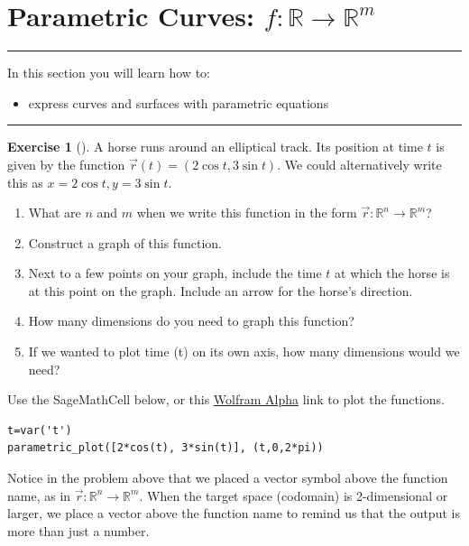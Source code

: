 \documentclass[10pt,]{book}
\theoremstyle{plain}
\theoremstyle{definition}
\theoremstyle{definition}
\theoremstyle{definition}
\theoremstyle{definition}
\newtheorem{exploration}[project]{Exercise}
\newenvironment{objectives}[1]{\noindent\rule{\linewidth}{0.1ex}\newline{\textbf{{\large#1}}\par\smallskip}}{\par\noindent\rule{\linewidth}{0.1ex}\par\smallskip}
\theoremstyle{definition}
\numberwithin{equation}{section}
\begin{document}
\section[{Parametric Curves: \(f\colon {\mathbb{R}}\to {\mathbb{R}}^m \)}]{Parametric Curves: \(f\colon {\mathbb{R}}\to {\mathbb{R}}^m \)}\label{ch06_02_pcurves}
\begin{objectives}{Objectives}\label{objectives-11}
In this section you will learn how to:%
%
\begin{itemize}[label=\textbullet]
\item{}express curves and surfaces with parametric equations%
\end{itemize}
\end{objectives}
\begin{exploration}[]\label{prob_parametric_curve_in_plane}
A horse runs around an elliptical track. Its position at time \(t\) is given by the function \(\vec r(t)=(2\cos t, 3\sin t).\) We could alternatively write this as \(x=2\cos t, y=3\sin t\).%
\begin{enumerate}[font=\bfseries,label=(\alph*),ref=\alph*]
\item\label{task-171} What are \(n\) and \(m\) when we write this function in the form  \(\vec r\colon {\mathbb{R}}^n\to {\mathbb{R}}^m\)?%
\item\label{task-172} Construct a graph of this function.%
\item\label{task-173} Next to a few points on your graph, include the time \(t\) at which the horse is at this point on the graph. Include an arrow for the horse's direction.%
\item\label{task-174} How many dimensions do you need to graph this function?%
\item\label{task-175} If we wanted to plot time (t) on its own axis, how many dimensions would we need?%
\end{enumerate}
\bigbreak
Use the SageMathCell below, or this \href{http://wolfr.am/wAkR8l}{Wolfram Alpha} link to plot the functions.%
\begin{lstlisting}[style=sageinput]
t=var('t')
parametric_plot([2*cos(t), 3*sin(t)], (t,0,2*pi))
\end{lstlisting}
\end{exploration}
Notice in the problem above that we placed a vector symbol above the function name, as in \(\vec r\colon {\mathbb{R}}^n\to {\mathbb{R}}^m\). When the target space (codomain) is 2-dimensional or larger, we place a vector above the function name to remind us that the output is more than just a number.%
\end{document}
